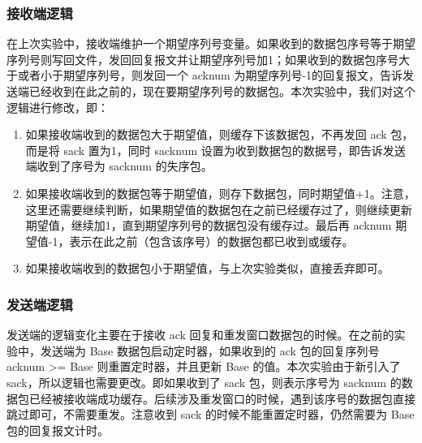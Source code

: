 \documentclass[UTF8,a4paper,10pt]{ctexart}
\begin{document}
\subsubsection{接收端逻辑}
在上次实验中，接收端维护一个期望序列号变量。如果收到的数据包序号等于期望序列号则写回文件，发回回复报文并让期望序列号加1；如果收到的数据包序号大于或者小于期望序列号，则发回一个 acknum 为期望序列号-1的回复报文，告诉发送端已经收到在此之前的，现在要期望序列号的数据包。本次实验中，我们对这个逻辑进行修改，即：
\begin{enumerate}
    \item 如果接收端收到的数据包大于期望值，则缓存下该数据包，不再发回 ack 包，而是将 sack 置为1，同时 sacknum 设置为收到数据包的数据号，即告诉发送端收到了序号为 sacknum 的失序包。
    \item 如果接收端收到的数据包等于期望值，则存下数据包，同时期望值+1。注意，这里还需要继续判断，如果期望值的数据包在之前已经缓存过了，则继续更新期望值，继续加1，直到期望序列号的数据包没有缓存过。最后再 acknum 期望值-1，表示在此之前（包含该序号）的数据包都已收到或缓存。
    \item 如果接收端收到的数据包小于期望值，与上次实验类似，直接丢弃即可。
\end{enumerate}\par

\subsubsection{发送端逻辑}
发送端的逻辑变化主要在于接收 ack  回复和重发窗口数据包的时候。在之前的实验中，发送端为 Base 数据包启动定时器，如果收到的 ack 包的回复序列号 acknum >= Base 则重置定时器，并且更新 Base 的值。本次实验由于新引入了 sack，所以逻辑也需要更改。即如果收到了 sack 包，则表示序号为 sacknum 的数据包已经被接收端成功缓存。后续涉及重发窗口的时候，遇到该序号的数据包直接跳过即可，不需要重发。注意收到 sack 的时候不能重置定时器，仍然需要为 Base 包的回复报文计时。
\end{document}
